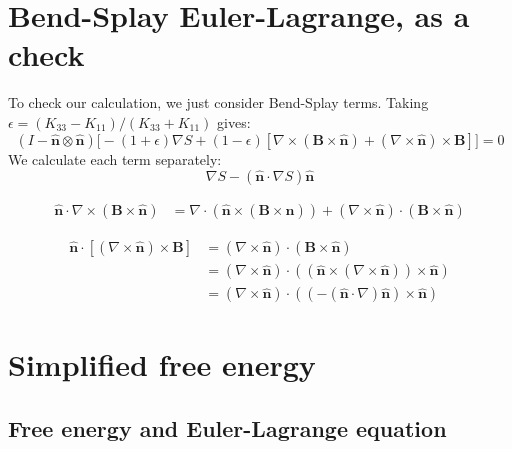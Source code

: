 \documentclass[reqno]{article}
\newcommand{\n}{\hat{\mathbf{n}}}
\begin{document}
\section{Bend-Splay Euler-Lagrange, as a check}

To check our calculation, we just consider Bend-Splay terms.
Taking $\epsilon = (K_{33} - K_{11}) / (K_{33} + K_{11})$ gives:
\begin{equation}
    \left(I - \n \otimes \n\right)
    \biggl[
        -(1 + \epsilon) \nabla S
        + (1 - \epsilon) \left[ 
            \nabla \times \left(\mathbf{B} \times \n \right)
            + \left( \nabla \times \n \right) \times \mathbf{B}
        \right]
    \biggr]
    =
    0
\end{equation}
We calculate each term separately:
\begin{equation}
    \nabla S
    -
    \left(\n \cdot \nabla S\right) \n
\end{equation}

\begin{equation}
\begin{split}
    \n \cdot \nabla \times \left( \mathbf{B} \times \n \right)
    &=
    \nabla \cdot \left(\n \times \left(\mathbf{B} \times \n \right) \right)
    + \left( \nabla \times \n \right) \cdot \left( \mathbf{B} \times \n\right)
\end{split}
\end{equation}

\begin{equation}
\begin{split}
    \n \cdot \left[ \left(\nabla \times \n \right) \times \mathbf{B} \right]
    &=
    \left( \nabla \times \n \right) \cdot \left( \mathbf{B} \times \n \right) \\
    &= 
    \left( \nabla \times \n \right) \cdot \left( \left(\n \times \left(\nabla \times \n\right) \right) \times \n \right) \\
    &= 
    \left( \nabla \times \n \right) \cdot \left( \left(-\left(\n \cdot \nabla \right) \n \right) \times \n \right)
\end{split}
\end{equation}

\section{Simplified free energy}

\subsection{Free energy and Euler-Lagrange equation}
\end{document}
